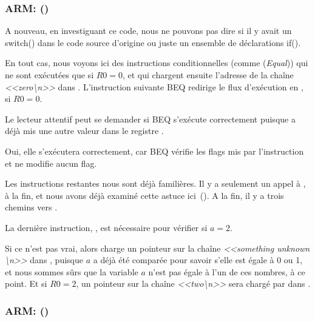 \subsubsection{ARM: \OptimizingKeilVI (\ARMMode)}



A nouveau, en investiguant ce code, nous ne pouvons pas dire si il y avait un switch()
dans le code source d'origine ou juste un ensemble de déclarations if().


En tout cas, nous voyons ici des instructions conditionnelles (comme \ADREQ (\emph{Equal}))
qui ne sont exécutées que si $R0=0$, et qui chargent ensuite l'adresse de la chaîne
\emph{<<zero\textbackslash{}n>>} dans .
L'instruction suivante \ac{BEQ} redirige le flux d'exécution en , si $R0=0$.

Le lecteur attentif peut se demander si \ac{BEQ} s'exécute correctement puisque \ADREQ
a déjà mis une autre valeur dans le registre .

Oui, elle s'exécutera correctement, car \ac{BEQ} vérifie les flags mis par l'instruction
\CMP et \ADREQ ne modifie aucun flag.

Les instructions restantes nous sont déjà familières.
Il y a seulement un appel à \printf, à la fin, et nous avons déjà examiné cette
astuce ici~().
A la fin, il y a trois chemins vers \printf{}.

La dernière instruction, , est nécessaire pour vérifier si $a=2$.

Si ce n'est pas vrai, alors \ADRNE charge un pointeur sur la chaîne \emph{<<something unknown \textbackslash{}n>>}
dans , puisque $a$ a déjà été comparée pour savoir s'elle est égale
à 0 ou 1, et nous sommes sûrs que la variable $a$ n'est pas égale à l'un de
ces nombres, à ce point.
Et si $R0=2$, un pointeur sur la chaîne \emph{<<two\textbackslash{}n>>} sera chargé
par \ADREQ dans .

\subsubsection{ARM: \OptimizingKeilVI (\ThumbMode)}



